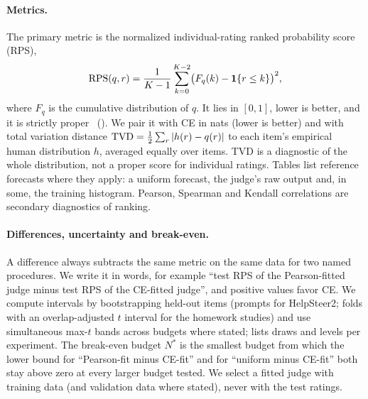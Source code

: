 \paragraph{Metrics.}
The primary metric is the normalized individual-rating ranked probability score (RPS),
\begin{equation}
\mathrm{RPS}(q,r)=\frac{1}{K-1}\sum_{k=0}^{K-2}\bigl(F_q(k)-\mathbf{1}\{r\le k\}\bigr)^2 ,
\label{eq:rps}
\end{equation}
where $F_q$ is the cumulative distribution of $q$.
It lies in $[0,1]$, lower is better, and it is strictly proper~\citep{epstein1969scoring,gneiting2007strictly} ().
We pair it with CE in nats (lower is better) and with total variation distance $\mathrm{TVD}=\tfrac12\sum_r|h(r)-q(r)|$ to each item's empirical human distribution $h$, averaged equally over items.
TVD is a diagnostic of the whole distribution, not a proper score for individual ratings.
Tables list reference forecasts where they apply: a uniform forecast, the judge's raw output and, in some, the training histogram.
Pearson, Spearman and Kendall correlations are secondary diagnostics of ranking.

\paragraph{Differences, uncertainty and break-even.}
A difference always subtracts the same metric on the same data for two named procedures.
We write it in words, for example ``test RPS of the Pearson-fitted judge minus test RPS of the CE-fitted judge'', and positive values favor CE.
We compute intervals by bootstrapping held-out items (prompts for HelpSteer2; folds with an overlap-adjusted $t$ interval for the homework studies) and use simultaneous max-$t$ bands across budgets where stated;  lists draws and levels per experiment.
The break-even budget $N^\ast$ is the smallest budget from which the lower bound for ``Pearson-fit minus CE-fit'' and for ``uniform minus CE-fit'' both stay above zero at every larger budget tested.
We select a fitted judge with training data (and validation data where stated), never with the test ratings.
